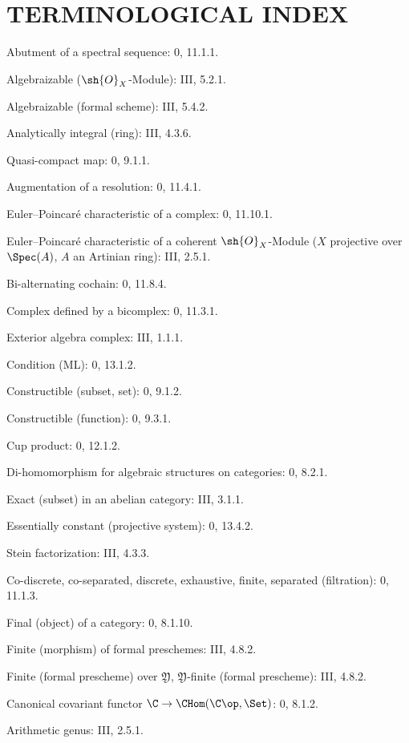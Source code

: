 \clearpage
{}
\section*{TERMINOLOGICAL INDEX}

\begin{flushleft}
Abutment of a spectral sequence: 0, 11.1.1.

Algebraizable ($\sh{O}_X$-Module): III, 5.2.1.

Algebraizable (formal scheme): III, 5.4.2.

Analytically integral (ring): III, 4.3.6.

Quasi-compact map: 0, 9.1.1.

Augmentation of a resolution: 0, 11.4.1.

Euler--Poincaré characteristic of a complex: 0, 11.10.1.

Euler--Poincaré characteristic of a coherent $\sh{O}_X$-Module
($X$ projective over $\Spec(A)$, $A$ an Artinian ring): III, 2.5.1.

Bi-alternating cochain: 0, 11.8.4.

Complex defined by a bicomplex: 0, 11.3.1.

Exterior algebra complex: III, 1.1.1.

Condition (ML): 0, 13.1.2.

Constructible (subset, set): 0, 9.1.2.

Constructible (function): 0, 9.3.1.

Cup product: 0, 12.1.2.

Di-homomorphism for algebraic structures on categories: 0, 8.2.1.

Exact (subset) in an abelian category: III, 3.1.1.

Essentially constant (projective system): 0, 13.4.2.

Stein factorization: III, 4.3.3.

Co-discrete, co-separated, discrete, exhaustive, finite, separated
(filtration): 0, 11.1.3.

Final (object) of a category: 0, 8.1.10.

Finite (morphism) of formal preschemes: III, 4.8.2.

Finite (formal prescheme) over $\mathfrak Y$,
$\mathfrak Y$-finite (formal prescheme): III, 4.8.2.

Canonical covariant functor $\C\to\CHom(\C\op,\Set)$: 0, 8.1.2.

Arithmetic genus: III, 2.5.1.


\end{flushleft}
